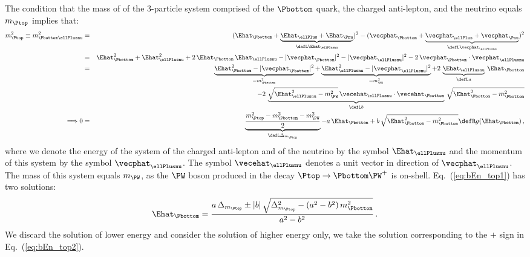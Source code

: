 The condition that the mass of of the $3$-particle system comprised of the $\Pbottom$ quark, the charged anti-lepton, and the neutrino equals $m_{\Ptop}$ implies that:
\begin{eqnarray}
m_{\Ptop}^{2} \equiv m_{\Pbottom\ellPlusnu}^{2} 
 & = & ( \Ehat_{\Pbottom} + \underbrace{\Ehat_{\ellPlus} + \Ehat_{\Pnu}}_{\defL \Ehat_{\ellPlusnu}} )^{2} 
- ( \vecphat_{\Pbottom} + \underbrace{\vecphat_{\ellPlus} + \vecphat_{\Pnu}}_{\defL \vecphat_{\ellPlusnu}} )^{2} \nonumber \\
 & = & \Ehat_{\Pbottom}^{2} + \Ehat_{\ellPlusnu}^{2} + 2 \, \Ehat_{\Pbottom} \, \Ehat_{\ellPlusnu} 
- |\vecphat_{\Pbottom}|^{2} - |\vecphat_{\ellPlusnu}|^{2} - 2 \, \vecphat_{\Pbottom} \cdot \vecphat_{\ellPlusnu} \nonumber \\
 & = & \underbrace{\Ehat_{\Pbottom}^{2} - |\vecphat_{\Pbottom}|^{2}}_{= m_{\Pbottom}^{2}} 
+ \underbrace{\Ehat_{\ellPlusnu}^{2} - |\vecphat_{\ellPlusnu}|^{2}}_{= m_{\PW}^{2}} 
+ 2 \, \underbrace{\Ehat_{\ellPlusnu}}_{\defL a} \, \Ehat_{\Pbottom} \nonumber \\
 & & \quad - 2 \, \underbrace{\sqrt{\Ehat_{\ellPlusnu}^{2} - m_{\PW}^{2}} \, \vecehat_{\ellPlusnu} \cdot \vecehat_{\Pbottom}}_{\defL b} \, 
 \sqrt{\Ehat_{\Pbottom}^{2} - m_{\Pbottom}^{2}} \nonumber \\
\Longrightarrow 0 & = & \underbrace{\frac{m_{\Ptop}^{2} - m_{\Pbottom}^{2} - m_{\PW}^{2}}{2}}_{\defL \Delta_{m_{\Ptop}}} - a \, \Ehat_{\Pbottom} + b \, \sqrt{\Ehat_{\Pbottom}^{2} - m_{\Pbottom}^{2}} 
  \defR g(\Ehat_{\Pbottom}) \, ,
\label{eq:bEn_top1}
\end{eqnarray}
where we denote the energy of the system of the charged anti-lepton and of the neutrino by the symbol $\Ehat_{\ellPlusnu}$ 
and the momentum of this system by the symbol $\vecphat_{\ellPlusnu}$.
The symbol $\vecehat_{\ellPlusnu}$ denotes a unit vector in direction of $\vecphat_{\ellPlusnu}$.
The mass of this system equals $m_{\PW}$, as the $\PW$ boson produced in the decay $\Ptop \to \Pbottom\PW^{+}$ is on-shell.
Eq.~(\ref{eq:bEn_top1}) has two solutions:
\begin{equation}
\Ehat_{\Pbottom} = \frac{a \, \Delta_{m_{\Ptop}} \pm |b| \, \sqrt{\Delta_{m_{\Ptop}}^{2} - (a^{2} - b^{2}) \, m_{\Pbottom}^{2}}}{a^{2} - b^{2}} \, .
\label{eq:bEn_top2}
\end{equation}
We discard the solution of lower energy and consider the solution of higher energy only,
\ie we take the solution corresponding to the $+$ sign in Eq.~(\ref{eq:bEn_top2}).

